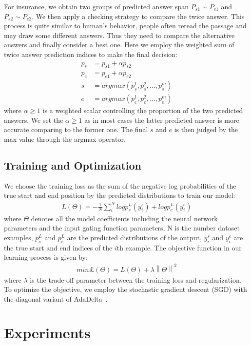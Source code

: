 \documentclass[letterpaper]{article} %
\begin{document}
 For insurance, we obtain two groups of predicted answer span $P_{s1}\sim P_{e1}$ and $P_{s2}\sim P_{e2}$. We then apply a checking strategy to compare the twice answer. This process is quite similar to human's behavior, people often reread the passage and may draw some different answers. Thus they need to compare the alternative answers and finally consider a best one. Here we employ the weighted sum of twice answer prediction indices to make the final decision:
 \begin{align*}
 p_{s}&=p_{s1}+\alpha p_{s2}\\
 p_{e}&=p_{e1}+\alpha p_{e2}\\
 s&=argmax(p_s^1,p_s^2,...,p_s^m) \\
 e&=argmax(p_e^1,p_e^2,...,p_e^m) \tag{11}
 \end{align*} 
 where $\alpha \geq 1$ is a weighted scalar controlling the proportion of the two predicted answers. We set the $\alpha \geq 1$ as in most cases the latter predicted answer is more accurate comparing to the former one. The final $s$ and $e$ is then judged by the max value through the argmax operator.  
 
\subsection{Training and Optimization}
We choose the training loss as the sum of the negative log probabilities of the true start and end position by the predicted distributions to train our model:
\begin{align}
L(\Theta)=-\frac{1}{N}\sum_{i}^{N}logp_s^L(y_i^s)+logp_e^L(y_i^e) \tag{12}
\end{align}
where $\Theta$ denotes all the model coefficients including the neural network parameters and the input gating function parameters, N is the number dataset examples, $p_s^L$ and $p_e^L$ are the predicted distributions of the output, $y_i^s$ and $y_i^e$ are the true start and end indices of the $i$th example. The objective function in our learning process is given by:
\begin{align}
min\pounds  (\Theta)=L(\Theta)+\lambda \left \| \Theta \right \|^2 \tag{13}
\end{align}
where $\lambda$ is the trade-off parameter between the training loss and regularization. To optimize the objective, we employ the stochastic gradient descent (SGD) with the diagonal variant of AdaDelta~\cite{Zeiler2012ADADELTA}.

 \section{Experiments}
\end{document}
